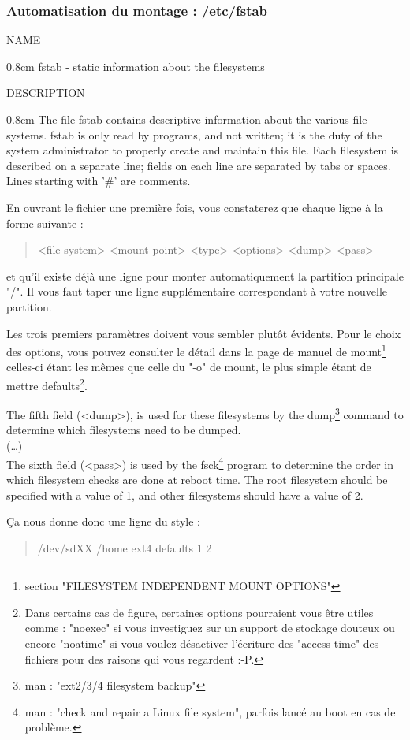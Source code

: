 \documentclass[a4paper,11pt]{article}
\newcommand{\commande}[1] {
    \begin{quote}
    \tt\raggedright #1
    \end{quote}
}
\newcommand{\man}[2]{
    \begin{tcolorbox}[toprule=3mm,width=\textwidth,outer arc=0mm,colbacktitle=grayman,coltitle=black,colback={grayman},colframe={grayman},title={man : \tt #1}]
        \tt\raggedright #2
    \end{tcolorbox}
}
\newcommand{\mandesc}[1]{
    \begin{adjustwidth}{0.8cm}{}
        #1
    \end{adjustwidth}
}
\begin{document}
\subsubsection{Automatisation du montage : /etc/fstab}
\man{fstab}{NAME
\mandesc{fstab - static information about the filesystems}
DESCRIPTION
\mandesc{The  file  fstab  contains descriptive information about the various file systems.  fstab is only read by programs, and not written; it is the duty of the system administrator to properly create and maintain this file.  Each filesystem is described on a separate line; fields on each line are separated by tabs or spaces.  Lines starting with '\#' are comments. }}
\par En ouvrant le fichier une première fois, vous constaterez que chaque ligne à la forme suivante :
\commande{<file system> <mount point> <type> <options> <dump> <pass>}
et qu'il existe déjà une ligne pour monter automatiquement la partition principale "/". Il vous faut taper une ligne supplémentaire correspondant à votre nouvelle partition.
\par Les trois premiers paramètres doivent vous sembler plutôt évidents. Pour le choix des options, vous pouvez consulter le détail dans la page de manuel de mount\footnote{section "FILESYSTEM INDEPENDENT MOUNT OPTIONS"} celles-ci étant les mêmes que celle du "-o" de mount, le plus simple étant de mettre defaults\footnote{Dans certains cas de figure, certaines options pourraient vous être utiles comme : "noexec" si vous investiguez sur un support de stockage douteux ou encore "noatime" si vous voulez désactiver l'écriture des "access time" des fichiers pour des raisons qui vous regardent :-P.}.
\man{fstab}{
The fifth field (<dump>), is used for these filesystems by the dump\footnote{man : "ext2/3/4 filesystem backup"} command to determine which filesystems need to be dumped.\\
(\dots)\\
The sixth field (<pass>) is used by the fsck\footnote{man : "check and repair a Linux file system", parfois lancé au boot en cas de problème.} program to determine the order in which filesystem checks are done at reboot time. The root filesystem should be specified with a value of 1, and other filesystems should have a value of 2.
}
\par Ça nous donne donc une ligne du style :
\commande{/dev/sdXX /home ext4 defaults 1 2}
\end{document}

